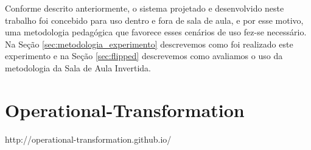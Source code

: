 Conforme descrito anteriormente, o sistema projetado e desenvolvido neste trabalho foi concebido para uso dentro e fora de sala de aula, e por esse motivo, uma metodologia pedagógica que favorece esses cenários de uso fez-se necessário. Na Seção \ref{sec:metodologia_experimento} descrevemos como foi realizado este experimento e na Seção \ref{sec:flipped} descrevemos como avaliamos o uso da metodologia da Sala de Aula Invertida.






\section{Operational-Transformation}
http://operational-transformation.github.io/


